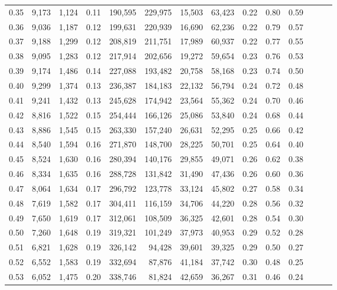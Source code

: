 \begin{tabular}{rrrrrrrrrrrrrr}
0.35 &  9,173 &  1,124 &  0.11 &  190,595 &  229,975 &  15,503 &  63,423 &  0.22 &  0.80 &      0.59 \\
0.36 &  9,036 &  1,187 &  0.12 &  199,631 &  220,939 &  16,690 &  62,236 &  0.22 &  0.79 &      0.57 \\
0.37 &  9,188 &  1,299 &  0.12 &  208,819 &  211,751 &  17,989 &  60,937 &  0.22 &  0.77 &      0.55 \\
0.38 &  9,095 &  1,283 &  0.12 &  217,914 &  202,656 &  19,272 &  59,654 &  0.23 &  0.76 &      0.53 \\
0.39 &  9,174 &  1,486 &  0.14 &  227,088 &  193,482 &  20,758 &  58,168 &  0.23 &  0.74 &      0.50 \\
0.40 &  9,299 &  1,374 &  0.13 &  236,387 &  184,183 &  22,132 &  56,794 &  0.24 &  0.72 &      0.48 \\
0.41 &  9,241 &  1,432 &  0.13 &  245,628 &  174,942 &  23,564 &  55,362 &  0.24 &  0.70 &      0.46 \\
0.42 &  8,816 &  1,522 &  0.15 &  254,444 &  166,126 &  25,086 &  53,840 &  0.24 &  0.68 &      0.44 \\
0.43 &  8,886 &  1,545 &  0.15 &  263,330 &  157,240 &  26,631 &  52,295 &  0.25 &  0.66 &      0.42 \\
0.44 &  8,540 &  1,594 &  0.16 &  271,870 &  148,700 &  28,225 &  50,701 &  0.25 &  0.64 &      0.40 \\
0.45 &  8,524 &  1,630 &  0.16 &  280,394 &  140,176 &  29,855 &  49,071 &  0.26 &  0.62 &      0.38 \\
0.46 &  8,334 &  1,635 &  0.16 &  288,728 &  131,842 &  31,490 &  47,436 &  0.26 &  0.60 &      0.36 \\
0.47 &  8,064 &  1,634 &  0.17 &  296,792 &  123,778 &  33,124 &  45,802 &  0.27 &  0.58 &      0.34 \\
0.48 &  7,619 &  1,582 &  0.17 &  304,411 &  116,159 &  34,706 &  44,220 &  0.28 &  0.56 &      0.32 \\
0.49 &  7,650 &  1,619 &  0.17 &  312,061 &  108,509 &  36,325 &  42,601 &  0.28 &  0.54 &      0.30 \\
0.50 &  7,260 &  1,648 &  0.19 &  319,321 &  101,249 &  37,973 &  40,953 &  0.29 &  0.52 &      0.28 \\
0.51 &  6,821 &  1,628 &  0.19 &  326,142 &   94,428 &  39,601 &  39,325 &  0.29 &  0.50 &      0.27 \\
0.52 &  6,552 &  1,583 &  0.19 &  332,694 &   87,876 &  41,184 &  37,742 &  0.30 &  0.48 &      0.25 \\
0.53 &  6,052 &  1,475 &  0.20 &  338,746 &   81,824 &  42,659 &  36,267 &  0.31 &  0.46 &      0.24 \\

\end{tabular}
